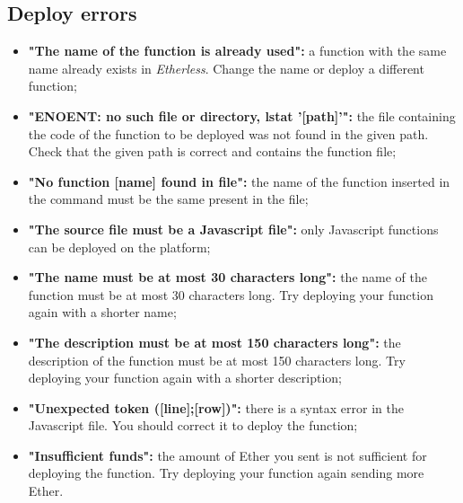   \subsection{Deploy errors}
  \begin{itemize}
    \item \textbf{"The name of the function is already used":} a function with the same name already exists in \textit{Etherless}. Change the name or deploy a different function;
    \item \textbf{"ENOENT: no such file or directory, lstat '[path]'":} the file containing the code of the function to be deployed was not found in the given path. Check that the given path is correct and contains the function file;
    \item \textbf{"No function [name] found in file":} the name of the function inserted in the command must be the same present in the file;
    \item \textbf{"The source file must be a Javascript file":} only Javascript functions can be deployed on the platform;
    \item \textbf{"The name must be at most 30 characters long":} the name of the function must be at most 30 characters long. Try deploying your function again with a shorter name;
    \item \textbf{"The description must be at most 150 characters long":} the description of the function must be at most 150 characters long. Try deploying your function again with a shorter description;
    \item \textbf{"Unexpected token ([line];[row])":} there is a syntax error in the Javascript file. You should correct it to deploy the function; 
    \item \textbf{"Insufficient funds":} the amount of Ether you sent is not sufficient for deploying the function. Try deploying your function again sending more Ether.
  \end{itemize}
  
